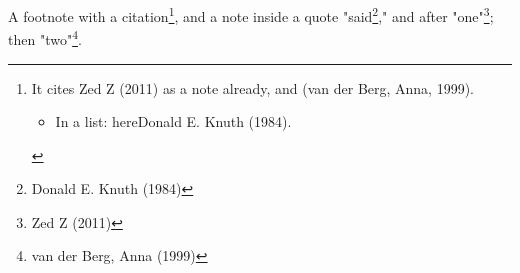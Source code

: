 \documentclass[11pt]{article}
\date{\today}
\title{}
\begin{document}
\tableofcontents

A footnote with a citation\footnote{It cites Zed Z (2011) as a note already, and (van der Berg, Anna, 1999).
\begin{itemize}
\item In a list: hereDonald E. Knuth (1984).
\end{itemize}}, and a note inside a quote "said\footnote{Donald E. Knuth (1984)},"
and after "one"\footnote{Zed Z (2011)}; then "two"\footnote{van der Berg, Anna (1999)}.
\end{document}
